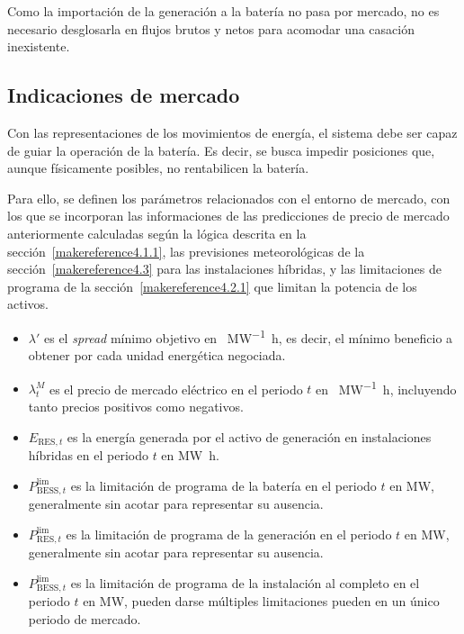 Como la importación de la generación a la batería no pasa por mercado, no es necesario desglosarla en flujos brutos y netos para acomodar una casación inexistente.

\subsection{Indicaciones de mercado}%
\label{makereference5.1.4}

Con las representaciones de los movimientos de energía, el sistema debe ser capaz de guiar la operación de la batería. Es decir, se busca impedir posiciones que, aunque físicamente posibles, no rentabilicen la batería.

Para ello, se definen los parámetros relacionados con el entorno de mercado, con los que se incorporan las informaciones de las predicciones de precio de mercado anteriormente calculadas según la lógica descrita en la sección~\ref{makereference4.1.1}, las previsiones meteorológicas de la sección~\ref{makereference4.3} para las instalaciones híbridas, y las limitaciones de programa de la sección~\ref{makereference4.2.1} que limitan la potencia de los activos.

\begin{itemize}

  \item \( \lambda' \) es el \textit{spread} mínimo objetivo en \si{\text{\euro}\per\mega\watt\hour}, es decir, el mínimo beneficio a obtener por cada unidad energética negociada.

  \item \( \lambda^{M}_{t} \) es el precio de mercado eléctrico en el periodo \( t \) en \si{\text{\euro}\per\mega\watt\hour}, incluyendo tanto precios positivos como negativos.

  \item \( E_{\text{RES}, t} \) es la energía generada por el activo de generación en instalaciones híbridas en el periodo \( t \) en \si{{\mega\watt\hour}}.

  \item \( P^{\text{lim}}_{\text{BESS}, t} \) es la limitación de programa de la batería en el periodo \( t \) en \si{\mega\watt}, generalmente sin acotar para representar su ausencia.

  \item \( P^{\text{lim}}_{\text{RES}, t} \) es la limitación de programa de la generación en el periodo \( t \) en \si{\mega\watt}, generalmente sin acotar para representar su ausencia.

  \item \( P^{\text{lim}}_{\text{BESS}, t} \) es la limitación de programa de la instalación al completo en el periodo \( t \) en \si{\mega\watt}, pueden darse múltiples limitaciones pueden en un único periodo de mercado.

\end{itemize}

